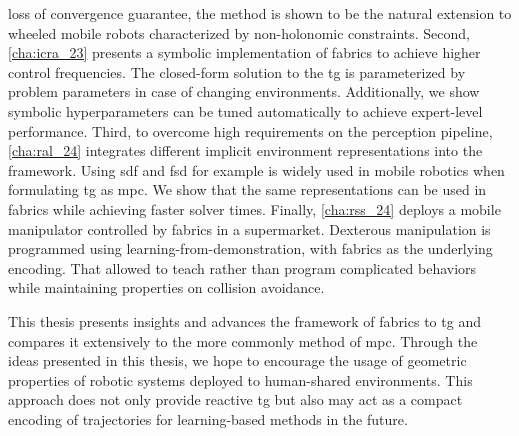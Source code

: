 loss of convergence guarantee, the method is shown to be the natural extension
to wheeled mobile robots characterized by non\hyp{}holonomic constraints.
Second, \cref{cha:icra_23} presents a symbolic
implementation of \ac{fabrics} to achieve higher control frequencies. The
closed-form solution to the \ac{tg} is parameterized by problem parameters in
case of changing environments. Additionally, we show symbolic 
hyperparameters can be tuned automatically to achieve expert-level performance.
Third, to overcome high requirements on the perception pipeline, \cref{cha:ral_24}
integrates different implicit environment representations into the framework.
Using \acf{sdf} and \acf{fsd} for example is widely used in mobile robotics when
formulating \ac{tg} as \ac{mpc}. We show that the same representations can be
used in \ac{fabrics} while achieving faster solver times.
Finally, 
\cref{cha:rss_24} deploys a mobile manipulator controlled by \ac{fabrics}
in a supermarket. Dexterous manipulation is programmed using
learning-from-demonstration, with \ac{fabrics} as the underlying encoding.
That allowed to teach rather than program complicated behaviors while
maintaining properties on collision avoidance.

This thesis presents insights and advances the framework of \ac{fabrics} to
\ac{tg} and compares it extensively to the more commonly method of \ac{mpc}.
Through the ideas presented in this thesis, we hope to encourage the
usage of geometric properties of robotic systems deployed to human-shared 
environments. This approach does not only provide reactive \ac{tg} but also may
act as a compact encoding of trajectories for learning-based methods in the
future.










